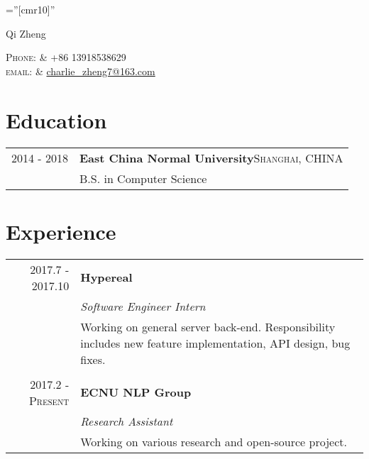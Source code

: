 \documentclass[a4paper,10pt]{article}
\begin{document}
	
	
	\pagestyle{empty} %
	
	\font\fb=''[cmr10]'' %
	
	\par{\centering
		{\Large Qi Zheng \textsc{}
		}\par}
	\centering\textsc{Phone:}     & +86 13918538629\\
	\centering\textsc{email:}     & \href{mailto:charlie\_zheng7@163.com}{charlie\_zheng7@163.com}
	
	
	\section{Education}
	\begin{tabular}{rl}	
		2014 - 2018 & \textbf{East China Normal University}\qquad \qquad \qquad \qquad \qquad \textsc{Shanghai, CHINA}\\
		
		& B.S. in Computer Science\\
		
	\end{tabular}
	
	\section{Experience}
	\begin{tabular}{r|p{11cm}}
		\textsc{2017.7 - 2017.10} & \textbf{Hypereal}\\&\emph{Software Engineer Intern}\\&\footnotesize{Working on general server back-end. Responsibility includes new feature implementation, API design, bug fixes.}\\\multicolumn{2}{c}{} \\
		\textsc{2017.2 - Present} & \textbf{ECNU NLP Group}\\&\emph{Research Assistant}\\&\footnotesize{Working on various research and open-source project.}
	\end{tabular}
	
\end{document}
